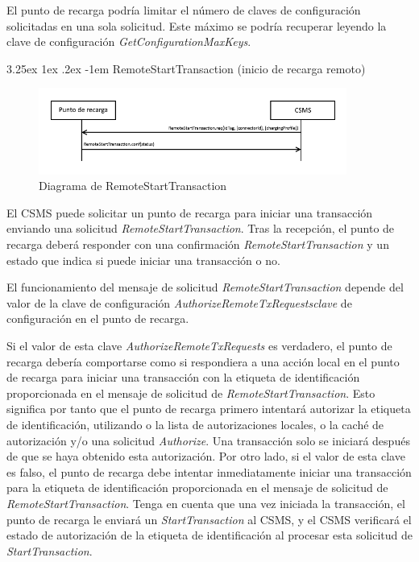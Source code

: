 \documentclass[12pt,a4paper,onecolumn,oneside]{report}
\makeatletter
\renewcommand\paragraph{\@startsection{paragraph}{5}{\z@}%
  {3.25ex \@plus1ex \@minus.2ex}%
  {-1em}%
  {\normalfont\normalsize\bfseries}}
\makeatother
\begin{document}
El punto de recarga podría limitar el número de claves de configuración solicitadas en una sola solicitud. Este máximo se podría recuperar leyendo la clave de configuración \textit{GetConfigurationMaxKeys}.


\paragraph{RemoteStartTransaction (inicio de recarga remoto)}
\label{RemoteStartTransaction (inicio de recarga remoto)}


\begin{figure}[H] 
\centering
  \includegraphics[width=0.9\textwidth]{figuras/diagramaremotestarttransaction.png}
  \caption[Diagrama de \textit{RemoteStartTransaction}]{Diagrama de RemoteStartTransaction\\
  }
  \label{fig:diagramaremotestarttransaction}
\end{figure}



El CSMS puede solicitar un punto de recarga para iniciar una transacción enviando una solicitud \textit{RemoteStartTransaction}. Tras la recepción, el punto de recarga deberá responder con una confirmación \textit{RemoteStartTransaction} y un estado que indica si puede iniciar una transacción o no.

El funcionamiento del mensaje de solicitud \textit{RemoteStartTransaction} depende del valor de la clave de configuración \textit{AuthorizeRemoteTxRequestsclave} de configuración en el punto de recarga.

Si el valor de esta clave \textit{AuthorizeRemoteTxRequests} es verdadero, el punto de recarga debería comportarse como si respondiera a una acción local en el punto de recarga para iniciar una transacción con la etiqueta de identificación proporcionada en el mensaje de solicitud de \textit{RemoteStartTransaction}. Esto significa por tanto que el punto de recarga primero intentará autorizar la etiqueta de identificación, utilizando o la lista de autorizaciones locales, o la caché de autorización y/o una solicitud \textit{Authorize}. Una transacción solo se iniciará después de que se haya obtenido esta autorización. Por otro lado, si el valor de esta clave es falso, el punto de recarga debe intentar inmediatamente iniciar una transacción para la etiqueta de identificación proporcionada en el mensaje de solicitud de \textit{RemoteStartTransaction}. Tenga en cuenta que una vez iniciada la transacción, el punto de recarga le enviará un \textit{StartTransaction} al CSMS, y el CSMS verificará el estado de autorización de la etiqueta de identificación al procesar esta solicitud de \textit{StartTransaction}.
\end{document}

